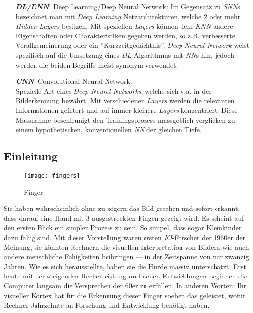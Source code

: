 \begin{itemize}[leftmargin=2cm]
	\item[\textbf{\textit{DL/DNN}}:] Deep Learning/Deep Neural Network:
	Im Gegensatz zu \textit{SNN}s bezeichnet man mit \textit{Deep Learning} Netzarchitekturen, welche 2 oder mehr \textit{Hidden Layers} besitzen. Mit speziellen \textit{Layers} können dem \textit{KNN} andere Eigenschaften oder Charakteristiken gegeben werden, so z.B. verbesserte Verallgemeinerung oder ein ''Kurzzeitgedächtnis''. \textit{Deep Neural Network} weist spezifisch auf die Umsetzung eines \textit{DL}-Algorithmus mit \textit{NN}s hin, jedoch werden die beiden Begriffe meist synonym verwendet\cite{dl}.
	
	\item[\textbf{\textit{CNN}}:] Convolutional Neural Network:\\
	 Spezielle Art eines \textit{Deep Neural Networks}, welche sich v.a. in der Bilderkennung bewährt. Mit verschiedenen \textit{Layers} werden die relevanten Informationen gefiltert und auf immer kleinere \textit{Layers} konzentriert. Diese Massnahme beschleunigt den Trainingsprozess massgeblich verglichen zu einem hypothetischen, konventionellen \textit{NN} der gleichen Tiefe\cite{cnn}.
	
\end{itemize}

\newpage

\subsection{Einleitung}


\begin{figure}[h]
	\centering
	\texttt{[image: fingers]}
	\caption[Finger, https://img.livestrongcdn.com/, 2017, Artikel 541001]{Finger}
\end{figure}

Sie haben wahrscheinlich ohne zu zögern das Bild gesehen und sofort erkannt, dass darauf eine Hand mit 3 ausgestreckten Fingen gezeigt wird. Es scheint auf den ersten Blick ein simpler Prozess zu sein. So simpel, dass sogar Kleinkinder dazu fähig sind. Mit dieser Vorstellung waren ersten \textit{KI}-Forscher der 1960er der Meinung, sie könnten Rechnern die visuellen Interpretation von Bildern wie auch andere menschliche Fähigkeiten beibringen --- in der Zeitspanne von nur zwanzig Jahren. Wie es sich herausstellte, haben sie die Hürde massiv unterschätzt. Erst heute mit der steigenden Rechenleistung und neuen Entwicklungen beginnen die Computer langsam die Versprechen der 60er zu erfüllen. In anderen Worten: Ihr visueller Kortex hat für die Erkennung dieser Finger soeben das geleistet, wofür Rechner Jahrzehnte an Forschung und Entwicklung benötigt haben.\\

